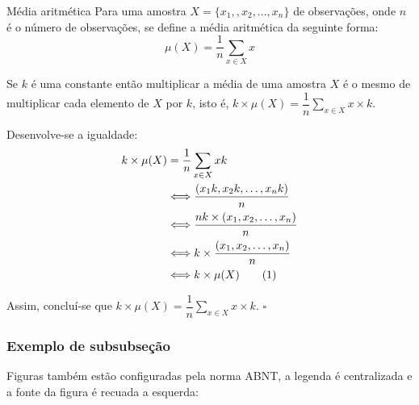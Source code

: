 \documentclass[courier]{uninove-ppgi}
\newcommand{\numberequation}[1]{\addtocounter{equation}{#1}\tag{\theequation}}
\begin{document}
\begin{definicao}{Média aritmética}
Para uma amostra $ X=\{x_1,, x_2, \ldots,x_n\} $ de observações, onde $ n $ é o número de observações, se define a média aritmética da seguinte forma:
\begin{equation}
\mu(X)=\dfrac{1}{n}\sum\limits_{x \in X}x
\end{equation}
\end{definicao}
\begin{proposicao}
Se $ k $ é uma constante então multiplicar a média de uma amostra $ X $ é o mesmo de multiplicar cada elemento de $ X $ por $ k $, isto é, $ k \times \mu(X) = \dfrac{1}{n} \sum\limits_{x \in X}x\times k $.
\end{proposicao}
\begin{prova}
Desenvolve-se a igualdade:
\begin{align*}
k \times \mu(X) &= \dfrac{1}{n} \sum\limits_{x \in X}xk \\
& \Longleftrightarrow  \dfrac{(x_1k,x_2k, \ldots, x_nk)}{n} \\
& \Longleftrightarrow  \dfrac{nk \times (x_1,x_2, \ldots, x_n)}{n} \\
& \Longleftrightarrow   k \times \dfrac{(x_1,x_2, \ldots, x_n)}{n} \\
& \Longleftrightarrow   k \times \mu(X) \numberequation{1}
\end{align*}
\end{prova}
Assim, concluí-se que $ k \times \mu(X) = \dfrac{1}{n} \sum\limits_{x \in X}x\times k $. $ \square $
 
\subsubsection{Exemplo de subsubseção}

Figuras também estão configuradas pela norma ABNT, a legenda é centralizada e a fonte da figura é recuada a esquerda:
\end{document}
